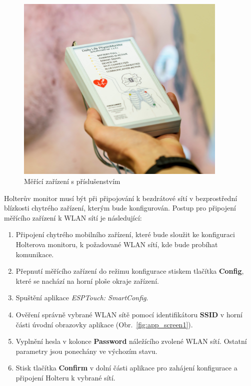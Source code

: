\begin{figure}[H]
    \begin{center}
        \includegraphics[width=0.9\textwidth]{../assets/device/holter1}
        \caption{Měřící zařízení s příslušenstvím}
        \label{fig:device}
    \end{center}
\end{figure}

Holterův monitor musí být při připojování k bezdrátové sítí v bezprostřední
blízkosti chytrého zařízení, kterým bude konfigurován. Postup pro připojení
měřícího zařízení k WLAN sítí je následující:
\begin{enumerate}
    \item Připojení chytrého mobilního zařízení, které bude sloužit ke
          konfiguraci Holterova monitoru, k požadované WLAN sítí, kde bude
          probíhat komunikace.
    \item Přepnutí měřícího zařízení do režimu konfigurace stiskem tlačítka
          \textbf{Config}, které se nachází na horní ploše okraje zařízení.
    \item Spuštění aplikace \textit{ESPTouch: SmartConfig}.
    \item Ověření správně vybrané WLAN sítě pomocí identifikátoru \textbf{SSID}
          v horní části úvodní obrazovky aplikace (Obr.~\ref{fig:app_screen1}).
    \item Vyplnění hesla v kolonce \textbf{Password} náležícího zvolené WLAN
          sítí. Ostatní parametry jsou ponechány ve výchozím stavu.
    \item Stisk tlačítka \textbf{Confirm} v dolní části aplikace pro zahájení
          konfigurace a připojení Holteru k vybrané sítí.
\end{enumerate}

